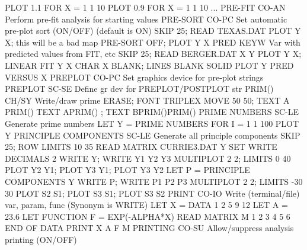                                   PLOT 1.1 FOR X = 1 1 10
                                  PLOT 0.9 FOR X = 1 1 10
... PRE-FIT                 CO-AN Perform pre-fit analysis for starting values
PRE-SORT                    CO-PC Set automatic pre-plot sort (ON/OFF)
                                  (default is ON)
                                  SKIP 25; READ TEXAS.DAT
                                  PLOT Y X;  this will be a bad map
                                  PRE-SORT OFF; PLOT Y X
PRED                        KEYW  Var with predicted values from FIT, etc
                                  SKIP 25; READ BERGER.DAT X Y
                                  PLOT Y X; LINEAR FIT Y X
                                  CHAR X BLANK; LINES BLANK SOLID
                                  PLOT Y PRED VERSUS X
PREPLOT                     CO-PC Set graphics device for pre-plot strings
PREPLOT                     SC-SE Define gr dev for PREPLOT/POSTPLOT str
PRIM()                      CH/SY Write/draw prime
                                  ERASE; FONT TRIPLEX
                                  MOVE 50 50; TEXT A PRIM()
                                  TEXT APRIM() ; TEXT BPRIM()PRIM()
PRIME NUMBERS               SC-LE Generate prime numbers
                                  LET Y = PRIME NUMBERS FOR I = 1 1 100
                                  PLOT Y
PRINCIPLE COMPONENTS        SC-LE Generate all principle components
                                  SKIP 25; ROW LIMITS 10 35
                                  READ MATRIX CURRIE3.DAT Y
                                  SET WRITE DECIMALS 2
                                  WRITE Y; WRITE Y1 Y2 Y3
                                  MULTIPLOT 2 2; LIMITS 0 40
                                  PLOT Y2 Y1; PLOT Y3 Y1; PLOT Y3 Y2
                                  LET P = PRINCIPLE COMPONENTS Y
                                  WRITE P; WRITE P1 P2 P3
                                  MULTIPLOT 2 2; LIMITS -30 30
                                  PLOT S2 S1; PLOT S3 S1; PLOT S3 S2
PRINT                       CO-IO Write (terminal/file) var, param, func
                                  (Synonym is WRITE)
                                  LET X = DATA 1 2 5 9 12
                                  LET A = 23.6
                                  LET FUNCTION F = EXP(-ALPHA*X)
                                  READ MATRIX M
                                  1 2 3
                                  4 5 6
                                  END OF DATA
                                  PRINT X A F M
PRINTING                    CO-SU Allow/suppress analysis printing (ON/OFF)
